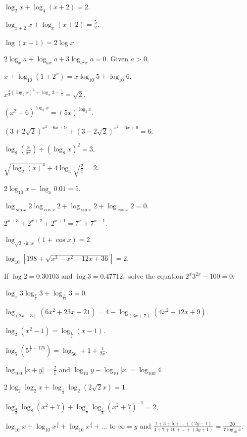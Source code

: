 \item $\log_2x + \log_4(x + 2) = 2$.
\item $\log_{x + 2}x + \log_x(x + 2) = \frac{5}{2}$.
\item $\log(x + 1) = 2\log x$.
\item $2\log_xa + \log_{ax}a + 3\log_{a^2x}a = 0.$ Given $a > 0$.
\item $x + \log_{10}(1 + 2^x) = x\log_{10}5 + \log_{10}6$.
\item $x^{\frac{3}{4}(\log_2x)^2 + \log_x2 - \frac{5}{4}} = \sqrt{2}$.
\item $(x^2 + 6)^{\log_3x} = (5x)^{\log_3x}$.
\item $(3 + 2\sqrt{2})^{x^2 - 6x + 9} + (3 - 2\sqrt{2})^{x^2 - 6x + 9} = 6$.
\item $\log_8\left(\frac{8}{x^2}\right)\div(\log_8x)^2 = 3$.
\item $\sqrt{\log_2(x)^4} + 4\log_4\sqrt{\frac{2}{x}} = 2$.
\item $2\log_{10}x - \log_x0.01 = 5$.
\item $\log_{\sin x}2\log_{\cos x}2 + \log_{\sin x}2 + \log_{\cos x}2 = 0$.
\item $2^{x + 3} + 2^{x+2} + 2^{x + 1} = 7^x + 7^{x - 1}$.
\item $\log_{\sqrt{2}\sin x}(1 + \cos x) = 2$.
\item $\log_{10}[198 + \sqrt{x^3 - x^2 - 12x + 36}] = 2$.
\item If $\log 2 = 0.30103$ and $\log 3 = 0.47712,$ solve the equation $2^x3^{2x} - 100 = 0$.
\item $\log_x3\log_{\frac{x}{3}}3 + \log_{\frac{x}{81}}3 = 0$.
\item $\log_{(2x + 3)}(6x^2 + 23x + 21) = 4 - \log_{(3x + 7)}(4x^2 + 12x + 9)$.
\item $\log_2(x^2 - 1) = \log_{\frac{1}{2}}(x - 1)$.
\item $\log_5\left(5^{\frac{1}{x} + 125}\right) = \log_56 + 1 + \frac{1}{2x}$.
\item $\log_{100}|x + y| = \frac{2}{1}$ and $\log_{10}y - \log_{10}|x| = \log_{100}4$.
\item $2\log_2\log_2x + \log_{\frac{1}{2}}\log_2(2\sqrt{2}x) = 1$.
\item $\log_{\frac{3}{4}}\log_8(x^2 + 7) + \log_{\frac{1}{2}}\log_{\frac{1}{4}}(x^2 + 7)^{-1} = 2$.
\item $\log_{10}x + \log_{10}x^{\frac{2}{1}} + \log_{10}x^{\frac{1}{4}} + \ldots$ to $\infty = y$ and $\frac{1 + 3 + 5 + \ldots +
  (2y - 1)}{4 + 7 + 10 + \ldots + (3y + 1)} = \frac{20}{7\log_{10}x}$.
